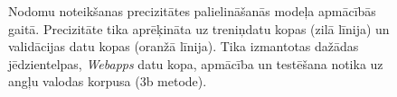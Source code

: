 \begin{figure}[h] 
   \centering
   \caption{Nodomu noteikšanas precizitātes palielināšanās modeļa apmācībās gaitā. Precizitāte tika aprēķināta uz treniņdatu kopas (zilā līnija) un validācijas datu kopas (oranžā līnija). Tika izmantotas dažādas jēdzientelpas, \textit{Webapps} datu kopa, apmācība un testēšana notika uz angļu valodas korpusa (3b metode).} 
   \label{fig:webapps-bert-xlm-en}
\end{figure}


